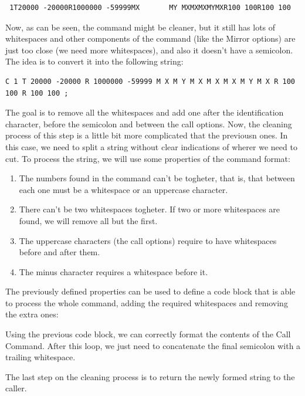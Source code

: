 \documentclass[11pt,twoside,openany,x11names,svgnames]{memoir}
\begin{document}
\begin{verbatim}
 1T20000 -20000R1000000 -59999MX       MY MXMXMXMYMXR100 100R100 100 
\end{verbatim}

Now, as can be seen, the command might be cleaner, but it still has lots of whitespaces and other components of the command (like the Mirror options) are just too close (we need more whitespaces), and also it doesn't have a semicolon. The idea is to convert it into the following string:

\begin{verbatim}
C 1 T 20000 -20000 R 1000000 -59999 M X M Y M X M X M X M Y M X R 100 100 R 100 100 ;
\end{verbatim}

The goal is to remove all the whitespaces and add one after the identification character, before the semicolon and between the call options. Now, the cleaning process of this step is a little bit more complicated that the previousn ones. In this case, we need to split a string without clear indications of wherer we need to cut. To process the string, we will use some properties of the command format:

\begin{enumerate}
\item The numbers found in the command can't be togheter, that is, that between each one must be a whitespace or an uppercase character.
\item There can't be two whitespaces togheter. If two or more whitespaces are found, we will remove all but the first.
\item The uppercase characters (the call options) require to have whitespaces before and after them.
\item The minus character requires a whitespace before it.
\end{enumerate}

The previously defined properties can be used to define a code block that is able to process the whole command, adding the required whitespaces and removing the extra ones:



Using the previous code block, we can correctly format the contents of the Call Command. After this loop, we just need to concatenate the final semicolon with a trailing whitespace.

The last step on the cleaning process is to return the newly formed string to the caller.
\end{document}
